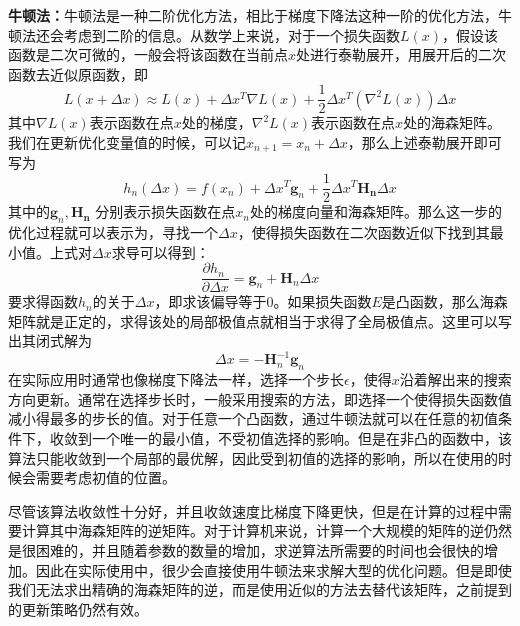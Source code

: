 \textbf{牛顿法：}牛顿法是一种二阶优化方法，相比于梯度下降法这种一阶的优化方法，牛顿法还会考虑到二阶的信息。从数学上来说，对于一个损失函数\(L(x)\)，假设该函数是二次可微的，一般会将该函数在当前点\(x\)处进行泰勒展开，用展开后的二次函数去近似原函数，即
\begin{equation}
    L(x+\Delta x) \approx L(x) + \Delta x^T \nabla L(x) + \frac{1}{2}\Delta x^T (\nabla^2 L(x))\Delta x
\end{equation}
其中\(\nabla L(x)\)表示函数在点\(x\)处的梯度，\(\nabla^2 L(x)\)表示函数在点\(x\)处的海森矩阵。我们在更新优化变量值的时候，可以记\(x_{n+1} = x_n + \Delta x\)，那么上述泰勒展开即可写为
\begin{equation}
    h_n(\Delta x) = f(x_n) + \Delta x^T \mathbf{g}_n + \frac{1}{2}\Delta x^T  \mathbf{H_n}\Delta x
\end{equation}
其中的\(\mathbf{g}_n, \mathbf{H_n}\) 分别表示损失函数在点\(x_n\)处的梯度向量和海森矩阵。那么这一步的优化过程就可以表示为，寻找一个\(\Delta x\)，使得损失函数在二次函数近似下找到其最小值。上式对\(\Delta x\)求导可以得到：
\begin{equation}\label{eq:newton}
    \frac { \partial h _ { n }\ } { \partial \Delta x } = \mathbf { g } _ { n } + \mathbf { H } _ { n } \Delta x
\end{equation}
要求得函数\(h_n\)的关于\(\Delta x\)，即求该偏导等于0。如果损失函数\(E\)是凸函数，那么海森矩阵就是正定的，求得该处的局部极值点就相当于求得了全局极值点。这里可以写出其闭式解为
\begin{equation}\label{eq:newton}
    \Delta x = -  \mathbf { H } _ { n }^{-1} \mathbf { g } _ { n }
\end{equation}
在实际应用时通常也像梯度下降法一样，选择一个步长\(\epsilon\)，使得\(x\)沿着解出来的搜索方向更新。通常在选择步长时，一般采用搜索的方法，即选择一个使得损失函数值减小得最多的步长的值。对于任意一个凸函数，通过牛顿法就可以在任意的初值条件下，收敛到一个唯一的最小值，不受初值选择的影响。但是在非凸的函数中，该算法只能收敛到一个局部的最优解，因此受到初值的选择的影响，所以在使用的时候会需要考虑初值的位置。

尽管该算法收敛性十分好，并且收敛速度比梯度下降更快，但是在计算的过程中需要计算其中海森矩阵的逆矩阵。对于计算机来说，计算一个大规模的矩阵的逆仍然是很困难的，并且随着参数的数量的增加，求逆算法所需要的时间也会很快的增加。因此在实际使用中，很少会直接使用牛顿法来求解大型的优化问题。但是即使我们无法求出精确的海森矩阵的逆，而是使用近似的方法去替代该矩阵，之前提到的更新策略仍然有效。


